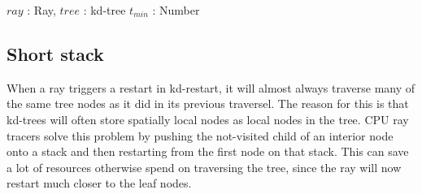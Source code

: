 \begin{algorithm}
  \caption{KD Restart}
  \label{alg:KDRestart}
  \begin{algorithmic}
              {$ray$ : Ray, $tree$ : kd-tree}
              {$t_{min}$ : Number}{
                    \ELSE
                    \ENDIF
                  \ENDWHILE
                  \ENDFOR
                  \ENDIF
                \ENDWHILE
              }
  \end{algorithmic}
\end{algorithm}

\subsection{Short stack}\label{sec:shortStack}


When a ray triggers a restart in kd-restart, it will almost always
traverse many of the same tree nodes as it did in its previous
traversel. The reason for this is that kd-trees will often store
spatially local nodes as local nodes in the tree. CPU ray tracers
solve this problem by pushing the not-visited child of an interior
node onto a stack and then restarting from the first node on that
stack. This can save a lot of resources otherwise spend on traversing
the tree, since the ray will now restart much closer to the leaf
nodes.

